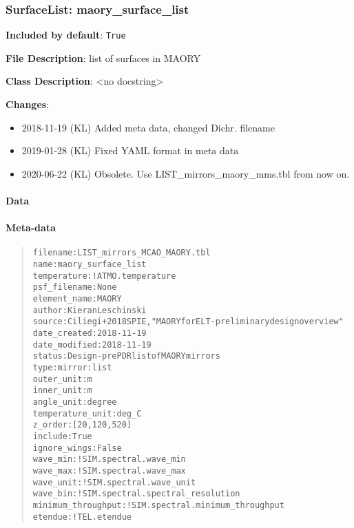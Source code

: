 \subsubsection{SurfaceList: \textquotedbl{}maory\_surface\_list\textquotedbl{}%
  \label{surfacelist-maory-surface-list}%
}

\textbf{Included by default}: \texttt{True}

\textbf{File Description}: list of surfaces in MAORY

\textbf{Class Description}: <no docstring>

\textbf{Changes}:

\begin{itemize}
\item 2018-11-19 (KL) Added meta data, changed Dichr. filename

\item 2019-01-28 (KL) Fixed YAML format in meta data

\item 2020-06-22 (KL) Obsolete. Use LIST\_mirrors\_maory\_mms.tbl from now on.
\end{itemize}


\paragraph{Data%
  \label{data}%
}


\paragraph{Meta-data%
  \label{meta-data}%
}

\begin{quote}
\begin{alltt}
          filename : LIST_mirrors_MCAO_MAORY.tbl
              name : maory_surface_list
       temperature : !ATMO.temperature
      psf_filename : None
      element_name : MAORY
            author : Kieran Leschinski
            source : Ciliegi+ 2018 SPIE, "MAORY for ELT - preliminary design overview"
      date_created : 2018-11-19
     date_modified : 2018-11-19
            status : Design - pre PDR list of MAORY mirrors
              type : mirror:list
        outer_unit : m
        inner_unit : m
        angle_unit : degree
  temperature_unit : deg_C
           z_order : [20, 120, 520]
           include : True
      ignore_wings : False
          wave_min : !SIM.spectral.wave_min
          wave_max : !SIM.spectral.wave_max
         wave_unit : !SIM.spectral.wave_unit
          wave_bin : !SIM.spectral.spectral_resolution
minimum_throughput : !SIM.spectral.minimum_throughput
           etendue : !TEL.etendue
\end{alltt}
\end{quote}


